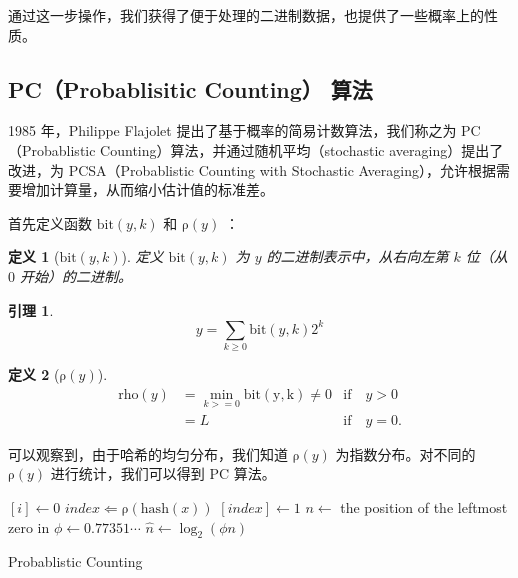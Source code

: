 \documentclass{ctexart}
\newtheorem{definition}{\hspace{2em} 定义}[subsection]
\newtheorem{corollary}{\hspace{2em} 引理}[subsection]
\begin{document}
    通过这一步操作，我们获得了便于处理的二进制数据，也提供了一些概率上的性质。

\subsection{PC（Probablisitic Counting） 算法 \cite{Flajolet:1985ixa}}

    1985 年，Philippe Flajolet 提出了基于概率的简易计数算法，我们称之为 PC（Probablistic Counting）算法，并通过随机平均（stochastic averaging）提出了改进，为 PCSA（Probablistic Counting with Stochastic Averaging），允许根据需要增加计算量，从而缩小估计值的标准差。

    首先定义函数 $\mathrm{bit}(y,k)$ 和 $\mathrm{\rho}(y)$ ：

    \begin{definition}[$\mathrm{bit}(y,k)$]
        定义 $\mathrm{bit}(y,k)$ 为 $y$ 的二进制表示中，从右向左第 $k$ 位（从 $0$ 开始）的二进制。
    \end{definition}

    \begin{corollary}
        \begin{equation*}
            y = \sum_{k \ge 0}{\mathrm{bit}(y, k) 2^k}
        \end{equation*}
    \end{corollary}

    \begin{definition}[$\mathrm{\rho}(y)$]
        \begin{align*}
            \mathrm{rho}(y) &= \min_{k >= 0} \mathrm{bit(y, k)} \ne 0 &\mathrm{if} \quad y > 0 \\
                &= L &\mathrm{if} \quad y = 0.
        \end{align*}
    \end{definition}

    可以观察到，由于哈希的均匀分布，我们知道 $\mathrm{\rho}(y)$ 为指数分布。对不同的 $\mathrm{\rho}(y)$ 进行统计，我们可以得到 PC 算法。

    \begin{algorithm}
        \BlankLine
         {
            \Bitmap $[i] \leftarrow 0$\;
        }
         {
            $index \Leftarrow \mathrm{\rho}(\mathrm{hash}(x))$\;
             {
                \Bitmap $\left[index\right] \leftarrow 1$\;
            }
        }
        $n \leftarrow$ the position of the leftmost zero in \Bitmap \;
        $\phi \leftarrow 0.77351 \cdots$ \;
        $\hat{n} \leftarrow \log_2(\phi n)$ \;
        \caption{Probablistic Counting}
    \end{algorithm}
\end{document}
